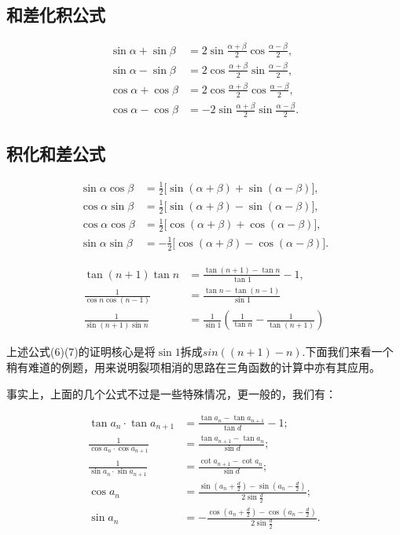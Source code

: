 \documentclass{article}
\begin{document}
\begin{tcolorbox}[colback=blue!10,colframe=blue!70!black,title=]
\subsection*{和差化积公式}
\begin{align*}
\sin \alpha + \sin \beta &= 2\sin\frac{\alpha+\beta}{2}\cos\frac{\alpha-\beta}{2}, \\
\sin \alpha - \sin \beta &= 2\cos\frac{\alpha+\beta}{2}\sin\frac{\alpha-\beta}{2}, \\
\cos \alpha + \cos \beta &= 2\cos\frac{\alpha+\beta}{2}\cos\frac{\alpha-\beta}{2}, \\
\cos \alpha - \cos \beta &= -2\sin\frac{\alpha+\beta}{2}\sin\frac{\alpha-\beta}{2}.
\end{align*}

\subsection*{积化和差公式}
\begin{align*}
\sin \alpha \cos \beta &= \frac{1}{2}\bigl[\sin(\alpha+\beta) + \sin(\alpha-\beta)\bigr], \\
\cos \alpha \sin \beta &= \frac{1}{2}\bigl[\sin(\alpha+\beta) - \sin(\alpha-\beta)\bigr], \\
\cos \alpha \cos \beta &= \frac{1}{2}\bigl[\cos(\alpha+\beta) + \cos(\alpha-\beta)\bigr], \\
\sin \alpha \sin \beta &= -\frac{1}{2}\bigl[\cos(\alpha+\beta) - \cos(\alpha-\beta)\bigr].
\end{align*}
\end{tcolorbox}

\begin{align}
\tan(n+1)\tan n &= \frac{\tan(n+1)-\tan n}{\tan 1} - 1,\\
\frac{1}{\cos n \cos(n-1)} &= \frac{\tan n - \tan(n-1)}{\sin 1}\\
\frac{1}{\sin(n+1) \sin n} &= \frac{1}{\sin 1}\left( \frac{1}{\tan n} -\frac{1}{\tan(n+1)}\right)
\end{align}

上述公式(6)(7)的证明核心是将$\sin 1$拆成$sin((n+1)-n)$.下面我们来看一个稍有难道的例题，用来说明裂项相消的思路在三角函数的计算中亦有其应用。
\vspace{1\baselineskip}

事实上，上面的几个公式不过是一些特殊情况，更一般的，我们有：

\begin{align*}
\tan a_n \cdot \tan a_{n+1} &= \frac{\tan a_n - \tan a_{n+1}}{\tan d} - 1; \\
\frac{1}{\cos a_n \cdot \cos a_{n+1}} &= \frac{\tan a_{n+1} - \tan a_n}{\sin d}; \\
\frac{1}{\sin a_n \cdot \sin a_{n+1}} &= \frac{\cot a_{n+1} - \cot a_n}{\sin d}; \\
\cos a_n &= \frac{\sin\!\left(a_n + \frac{d}{2}\right) - \sin\!\left(a_n - \frac{d}{2}\right)}{2\sin\frac{d}{2}}; \\
\sin a_n &= -\frac{\cos\!\left(a_n + \frac{d}{2}\right) - \cos\!\left(a_n - \frac{d}{2}\right)}{2\sin\frac{d}{2}}.
\end{align*}
\end{document}
